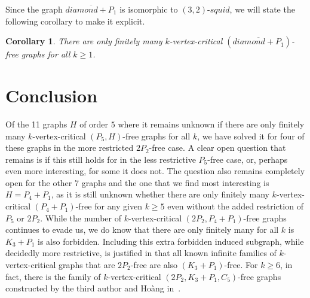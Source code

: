 \documentclass[11pt]{article}
\newtheorem{lemma}[theorem]{Lemma}
\newtheorem{corollary}[theorem]{Corollary}
\theoremstyle{definition}
\newcommand{\hl}[1]{$(3,#1)$-$squid$}
\begin{document}
Since the graph $\overline{diamond+P_1}$ is isomorphic to \hl{2}, we will state the following corollary to make it explicit.

\begin{corollary}
There are only finitely many $k$-vertex-critical $(\overline{diamond+P_1})$-free graphs for all $k\ge 1$.
\end{corollary}
%
%



\section{Conclusion}\label{sec:conclusion}

Of the 11 graphs $H$ of order $5$ where it remains unknown if there are only finitely many $k$-vertex-critical $(P_5,H)$-free graphs for all $k$, we have solved it for four of these graphs in the more restricted $2P_2$-free case. A clear open question that remains is if this still holds for in the less restrictive $P_5$-free case, or, perhaps even more interesting, for some it does not. The question also remains completely open for the other $7$ graphs and the one that we find most interesting is $H=P_4+P_1$, as it is still unknown whether there are only finitely many $k$-vertex-critical $(P_4+P_1)$-free for any given $k\ge 5$ even without the added restriction of $P_5$ or $2P_2$. While the number of $k$-vertex-critical $(2P_2,P_4+P_1)$-free graphs continues to evade us, we do know that there are only finitely many for all $k$ is $K_3+P_1$ is also forbidden. Including this extra forbidden induced subgraph, while decidedly more restrictive, is justified in that all known infinite families of $k$-vertex-critical graphs that are $2P_2$-free are also $(K_3+P_1)$-free. For $k\ge 6$, in fact, there is the family of $k$-vertex-critical $(2P_2,K_3+P_1,C_5)$-free graphs constructed by the third author and Ho\`{a}ng in~\cite{CameronHoang2023P5C5}. 
\end{document}
